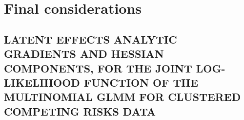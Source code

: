 \documentclass[12pt, %
               openright, %
               oneside, %
               a4paper, %
               chapter=TITLE, %
               section=TITLE, %
               brazil,
               english %
]{abntex2}
\renewcommand{\ABNTEXchapterfontsize}{\bfseries\large}
\begin{document}
\chapter{Final considerations}
\label{cap:finalc}

\setlength{\afterchapskip}{\baselineskip}

\postextual
\begin{apendicesenv}
\partapendices
{}
\renewcommand{\ABNTEXchapterfontsize}{\ABNTEXsectionfont}

\chapter{LATENT EFFECTS ANALYTIC GRADIENTS AND HESSIAN
  COMPONENTS, FOR THE JOINT LOG-LIKELIHOOD FUNCTION OF
  THE MULTINOMIAL GLMM FOR CLUSTERED COMPETING RISKS
  DATA}
\label{cap:appendixA}


\end{apendicesenv}
\end{document}
